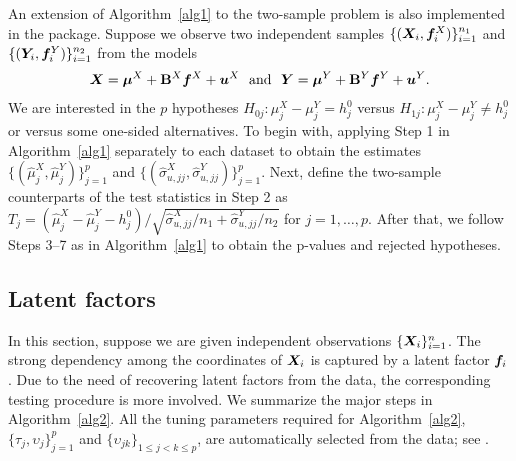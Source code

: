 An extension of Algorithm~\ref{alg1} to the two-sample problem is also implemented in the package. Suppose we observe two independent samples $\{ ( \bm{X}_i, \bm f^X_i ) \}_{i=1}^{n_1}$  and  $\{  (\bm{Y}_i, \bm f^Y_i ) \}_{i=1}^{n_2}$ from the models
\begin{align}
	\bm{X} = \bm{\mu}^X + \mathbf{B}^X \bm f^X + \bm{u}^X ~\mbox{ and }~ 	\bm{Y} = \bm{\mu}^Y + \mathbf{B}^Y \bm f^Y+ \bm{u}^Y.   \label{factor.model.twosample}
\end{align}
We are interested in the $p$ hypotheses $H_{0j}: \mu_j^X-\mu_j^Y =h_j^0$ versus $H_{1j}:  \mu_j^X-\mu_j^Y \neq h_j^0$ or versus some one-sided alternatives. To begin with, applying Step 1 in  Algorithm~\ref{alg1} separately to each dataset to obtain the estimates $\{(\hat{\mu}^X_j, \hat{\mu}^Y_j)\}_{j=1}^p$ and $\{(\hat{\sigma}^{X}_{u, jj}  , \hat{\sigma}^{ Y}_{u, jj}) \}_{j=1}^p$. Next, define the two-sample counterparts of the test statistics in Step 2 as
$ T_j=(  \hat{\mu}^X_{j}-\hat{\mu}^Y_{j}-h^0_j )/ \sqrt{ \hat{\sigma}^{X}_{u, jj} / n_1  + \hat{\sigma}^{ Y}_{u,jj}/n_2 }$ for $j=1,\ldots, p$.
After that, we follow Steps 3--7 as in  Algorithm~\ref{alg1}  to obtain the p-values and rejected hypotheses.


 \subsection{Latent factors}\label{sec:unknown_f}

In this section, suppose we are given independent observations $\{ \bm{X}_i\}_{i=1}^n$. The strong dependency among the coordinates of $\bm{X}_i$  is captured by a  latent factor $\bm f_i$ \citep{LS2008}. Due to the need of recovering latent factors from the data, the corresponding  testing procedure is more involved. We summarize the major steps in Algorithm~\ref{alg2}. All the tuning parameters required for Algorithm~\ref{alg2}, $\{ \tau_j, \upsilon_j\}_{j=1}^p$ and $\{ \upsilon_{jk} \}_{1\leq j<k\leq p}$, are automatically selected from the data; see .


